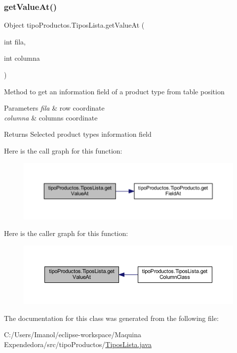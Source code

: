 \subsubsection{\texorpdfstring{get\+Value\+At()}{getValueAt()}}
{\footnotesize\ttfamily Object tipo\+Productos.\+Tipos\+Lista.\+get\+Value\+At (\begin{DoxyParamCaption}\item[{int}]{fila,  }\item[{int}]{columna }\end{DoxyParamCaption})}

Method to get an information field of a product type from table position 
\begin{DoxyParams}{Parameters}
{\em fila} & row coordinate \\
\hline
{\em columna} & columns coordinate \\
\hline
\end{DoxyParams}
\begin{DoxyReturn}{Returns}
Selected product type\textquotesingle{}s information field 
\end{DoxyReturn}
Here is the call graph for this function\+:
\nopagebreak
\begin{figure}[H]
\begin{center}
\leavevmode
\includegraphics[width=350pt]{classtipo_productos_1_1_tipos_lista_a78deb10c0cd2fbc2dfa0de19054e033e_cgraph}
\end{center}
\end{figure}
Here is the caller graph for this function\+:
\nopagebreak
\begin{figure}[H]
\begin{center}
\leavevmode
\includegraphics[width=350pt]{classtipo_productos_1_1_tipos_lista_a78deb10c0cd2fbc2dfa0de19054e033e_icgraph}
\end{center}
\end{figure}


The documentation for this class was generated from the following file\+:\begin{DoxyCompactItemize}
\item 
C\+:/\+Users/\+Imanol/eclipse-\/workspace/\+Maquina Expendedora/src/tipo\+Productos/\mbox{\hyperlink{_tipos_lista_8java}{Tipos\+Lista.\+java}}\end{DoxyCompactItemize}
